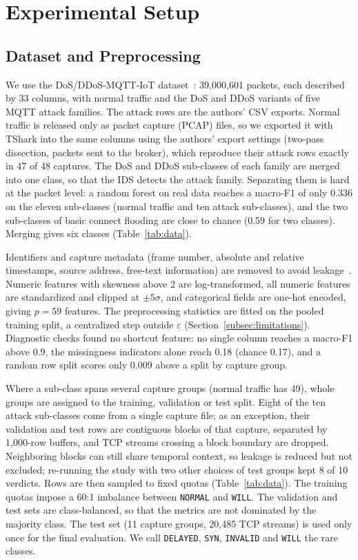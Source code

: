 \documentclass[conference]{IEEEtran}
\begin{document}
\section{Experimental Setup}\label{sec:setup}

\subsection{Dataset and Preprocessing}\label{subsec:dataset}
We use the DoS/DDoS-MQTT-IoT dataset~\cite{alatram2023}: 39,000,601 packets, each described by 33 columns, with normal traffic and the DoS and DDoS variants of five MQTT attack families. The attack rows are the authors' CSV exports. Normal traffic is released only as packet capture (PCAP) files, so we exported it with TShark into the same columns using the authors' export settings (two-pass dissection, packets sent to the broker), which reproduce their attack rows exactly in 47 of 48 captures. The DoS and DDoS sub-classes of each family are merged into one class, so that the IDS detects the attack family. Separating them is hard at the packet level: a random forest on real data reaches a macro-F1 of only 0.336 on the eleven sub-classes (normal traffic and ten attack sub-classes), and the two sub-classes of basic connect flooding are close to chance (0.59 for two classes). Merging gives six classes (Table~\ref{tab:data}).

Identifiers and capture metadata (frame number, absolute and relative timestamps, source address, free-text information) are removed to avoid leakage~\cite{arp2022}. Numeric features with skewness above 2 are log-transformed, all numeric features are standardized and clipped at $\pm 5\sigma$, and categorical fields are one-hot encoded, giving $p = 59$ features. The preprocessing statistics are fitted on the pooled training split, a centralized step outside $\varepsilon$ (Section~\ref{subsec:limitations}). Diagnostic checks found no shortcut feature: no single column reaches a macro-F1 above 0.9, the missingness indicators alone reach 0.18 (chance 0.17), and a random row split scores only 0.009 above a split by capture group.

Where a sub-class spans several capture groups (normal traffic has 49), whole groups are assigned to the training, validation or test split. Eight of the ten attack sub-classes come from a single capture file; as an exception, their validation and test rows are contiguous blocks of that capture, separated by 1,000-row buffers, and TCP streams crossing a block boundary are dropped. Neighboring blocks can still share temporal context, so leakage is reduced but not excluded; re-running the study with two other choices of test groups kept 8 of 10 verdicts. Rows are then sampled to fixed quotas (Table~\ref{tab:data}). The training quotas impose a 60:1 imbalance between \texttt{NORMAL} and \texttt{WILL}. The validation and test sets are class-balanced, so that the metrics are not dominated by the majority class. The test set (11 capture groups, 20,485 TCP streams) is used only once for the final evaluation. We call \texttt{DELAYED}, \texttt{SYN}, \texttt{INVALID} and \texttt{WILL} the rare classes.
\end{document}
